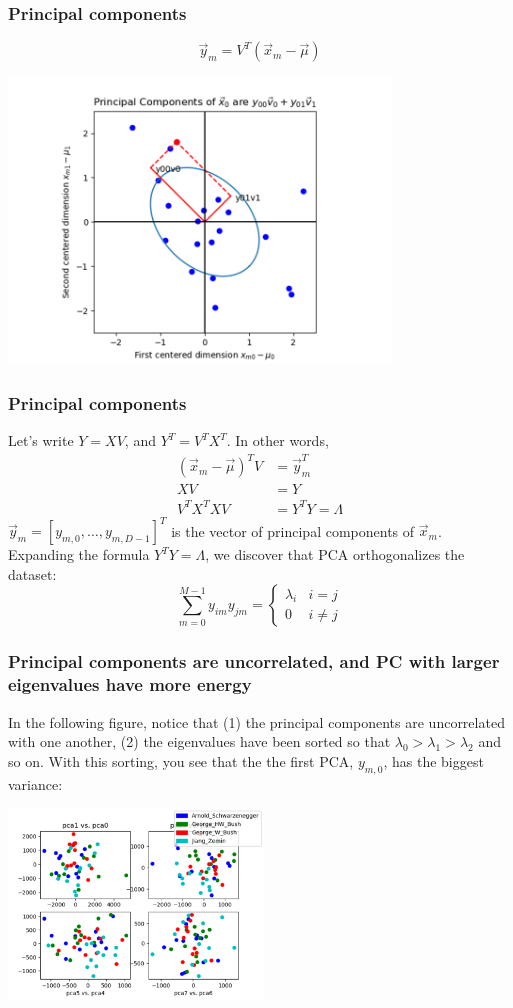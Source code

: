 \documentclass{beamer}
\begin{document}
\begin{frame}
  \frametitle{Principal components}
  \[
  \vec{y}_m=V^T(\vec{x}_m-\vec\mu)
  \]
  \centerline{\includegraphics[height=3in]{principal_components.png}}
\end{frame}

\begin{frame}
  \frametitle{Principal components}
  Let's write $Y=XV$, and $Y^T=V^TX^T$.  In other words,
  \begin{align*}
    (\vec{x}_m-\vec\mu)^TV &= \vec{y}_m^T\\
    XV &= Y\\
    V^TX^TXV &= Y^TY  = \Lambda
  \end{align*}
  $\vec{y}_m=[y_{m,0},\ldots,y_{m,D-1}]^T$ is the vector of
  principal components of $\vec{x}_m$.  Expanding the formula
  $Y^TY=\Lambda$, we discover that PCA orthogonalizes the dataset:
  \[
  \sum_{m=0}^{M-1}y_{im}y_{jm}=\begin{cases}
  \lambda_i & i=j\\0&i\ne j
  \end{cases}
  \]
\end{frame}

\begin{frame}
  \frametitle{Principal components are uncorrelated, and PC with
    larger eigenvalues have more energy}

  In the following figure, notice that (1) the principal components
  are uncorrelated with one another, (2) the eigenvalues have been
  sorted so that $\lambda_0>\lambda_1>\lambda_2$ and so on. With this
  sorting, you see that the the first PCA, $y_{m,0}$, has the biggest
  variance:

  \centerline{\includegraphics[height=2in]{pca_samples.png}}
\end{frame}
\end{document}
